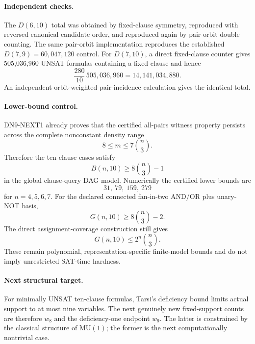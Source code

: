 \paragraph{Independent checks.}
The \(D(6,10)\) total was obtained by fixed-clause symmetry, reproduced with reversed canonical candidate order, and reproduced again by pair-orbit double counting. The same pair-orbit implementation reproduces the established \(D(7,9)=60{,}047{,}120\) control. For \(D(7,10)\), a direct fixed-clause counter gives 505,036,960 UNSAT formulas containing a fixed clause and hence
\[
\frac{280}{10}\,505{,}036{,}960=14{,}141{,}034{,}880.
\]
An independent orbit-weighted pair-incidence calculation gives the identical total.

\paragraph{Lower-bound control.}
DN9-NEXT1 already proves that the certified all-pairs witness property persists across the complete nonconstant density range
\[
8\le m\le7\binom n3.
\]
Therefore the ten-clause cases satisfy
\[
B(n,10)\ge8\binom n3-1
\]
in the global clause-query DAG model. Numerically the certified lower bounds are
\[
31,\ 79,\ 159,\ 279
\]
for \(n=4,5,6,7\). For the declared connected fan-in-two AND/OR plus unary-NOT basis,
\[
G(n,10)\ge8\binom n3-2.
\]
The direct assignment-coverage construction still gives
\[
G(n,10)\le2^n\binom n3.
\]
These remain polynomial, representation-specific finite-model bounds and do not imply unrestricted SAT-time hardness.

\paragraph{Next structural target.}
For minimally UNSAT ten-clause formulas, Tarsi's deficiency bound limits actual support to at most nine variables. The next genuinely new fixed-support counts are therefore \(w_8\) and the deficiency-one endpoint \(w_9\). The latter is constrained by the classical structure of \(\mathrm{MU}(1)\); the former is the next computationally nontrivial case.

